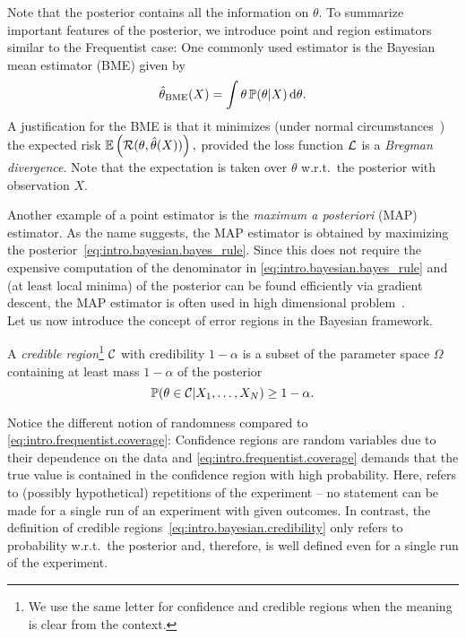 Note that the posterior contains all the information on $\theta$.
To summarize important features of the posterior, we introduce point and region estimators similar to the Frequentist case:
One commonly used estimator is the Bayesian mean estimator (BME) given by
\[
  \hat\theta_\mathrm{BME}(X) = \int \theta \, \mathbb{P}(\theta | X) \, \mathrm{d}\theta.
\]
A justification for the BME is that it minimizes (under normal circumstances~\cite{Lehmann_1998_Theory,Banerjee_2005_On}) the expected risk
\(
  \mathbb{E} \left( \mathcal{R}(\theta, \hat\theta(X)) \right),
\)
provided the loss function $\mathcal{L}$ is a \emph{Bregman divergence}.
Note that the expectation is taken over $\theta$ w.r.t.\ the posterior with observation $X$.

Another example of a point estimator is the \emph{maximum a posteriori} (MAP) estimator.
As the name suggests, the MAP estimator is obtained by maximizing the posterior~\eqref{eq:intro.bayesian.bayes_rule}.
Since this does not require the expensive computation of the denominator in \cref{eq:intro.bayesian.bayes_rule} and (at least local minima) of the posterior can be found efficiently via gradient descent, the MAP estimator is often used in high dimensional problem~\cite{Murphy_2012_Machine}.\\


Let us now introduce the concept of error regions in the Bayesian framework.
\begin{definition}
  \label{def:intro.bayesian.cr}
  A \emph{credible region}\footnote{%
    We use the same letter for confidence and credible regions when the meaning is clear from the context.
  }
  $\mathcal{C}$ with credibility $1-\alpha$ is a subset of the parameter space $\Omega$ containing at least mass $1-\alpha$ of the posterior
  \[
    \label{eq:intro.bayesian.credibility}
    \mathbb{P}(\theta \in \mathcal{C} | X_1, \ldots, X_N) \ge 1-\alpha.
  \]
\end{definition}
Notice the different notion of randomness compared to \cref{eq:intro.frequentist.coverage}:
Confidence regions are random variables due to their dependence on the data and \cref{eq:intro.frequentist.coverage} demands that the true value is contained in the confidence region with high probability.
Here,  refers to (possibly hypothetical) repetitions of the experiment -- no statement can be made for a single run of an experiment with given outcomes.
In contrast, the definition of credible regions~\eqref{eq:intro.bayesian.credibility} only refers to probability w.r.t.\ the posterior and, therefore, is well defined even for a single run of the experiment.

